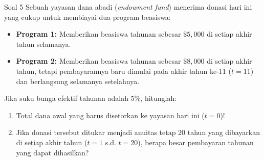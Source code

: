\documentclass[11pt,a4paper]{article}
\begin{document}
\begin{problembox}{Soal 5}
Sebuah yayasan dana abadi (\textit{endowment fund}) menerima donasi hari ini yang cukup untuk membiayai dua program beasiswa:
\begin{itemize}
    \item \textbf{Program 1:} Memberikan beasiswa tahunan sebesar $\$5{,}000$ di setiap akhir tahun selamanya.
    \item \textbf{Program 2:} Memberikan beasiswa tahunan sebesar $\$8{,}000$ di setiap akhir tahun, tetapi pembayarannya baru dimulai pada akhir tahun ke-11 ($t = 11$) dan berlangsung selamanya setelahnya.
\end{itemize}
Jika suku bunga efektif tahunan adalah $5\%$, hitunglah:
\begin{enumerate}[label=(\alph*)]
    \item Total dana awal yang harus disetorkan ke yayasan hari ini ($t = 0$)!
    \item Jika donasi tersebut ditukar menjadi anuitas tetap 20 tahun yang dibayarkan di setiap akhir tahun ($t = 1$ s.d. $t = 20$), berapa besar pembayaran tahunan yang dapat dihasilkan?
\end{enumerate}
\end{problembox}
\end{document}

